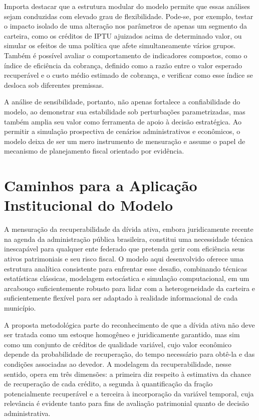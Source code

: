 \documentclass[a4paper,12pt]{article}
\begin{document}
Importa destacar que a estrutura modular do modelo permite que essas análises sejam conduzidas com elevado grau de flexibilidade. Pode-se, por exemplo, testar o impacto isolado de uma alteração nos parâmetros de apenas um segmento da carteira, como os créditos de IPTU ajuizados acima de determinado valor, ou simular os efeitos de uma política que afete simultaneamente vários grupos. Também é possível avaliar o comportamento de indicadores compostos, como o índice de eficiência da cobrança, definido como a razão entre o valor esperado recuperável e o custo médio estimado de cobrança, e verificar como esse índice se desloca sob diferentes premissas.

A análise de sensibilidade, portanto, não apenas fortalece a confiabilidade do modelo, ao demonstrar sua estabilidade sob perturbações parametrizadas, mas também amplia seu valor como ferramenta de apoio à decisão estratégica. Ao permitir a simulação prospectiva de cenários administrativos e econômicos, o modelo deixa de ser um mero instrumento de mensuração e assume o papel de mecanismo de planejamento fiscal orientado por evidência.

\section{Caminhos para a Aplicação Institucional do Modelo}
A mensuração da recuperabilidade da dívida ativa, embora juridicamente recente na agenda da administração pública brasileira, constitui uma necessidade técnica inescapável para qualquer ente federado que pretenda gerir com eficiência seus ativos patrimoniais e seu risco fiscal. O modelo aqui desenvolvido oferece uma estrutura analítica consistente para enfrentar esse desafio, combinando técnicas estatísticas clássicas, modelagem estocástica e simulação computacional, em um arcabouço suficientemente robusto para lidar com a heterogeneidade da carteira e suficientemente flexível para ser adaptado à realidade informacional de cada município.

A proposta metodológica parte do reconhecimento de que a dívida ativa não deve ser tratada como um estoque homogêneo e juridicamente garantido, mas sim como um conjunto de créditos de qualidade variável, cujo valor econômico depende da probabilidade de recuperação, do tempo necessário para obtê-la e das condições associadas ao devedor. A modelagem da recuperabilidade, nesse sentido, opera em três dimensões: a primeira diz respeito à estimativa da chance de recuperação de cada crédito, a segunda à quantificação da fração potencialmente recuperável e a terceira à incorporação da variável temporal, cuja relevância é evidente tanto para fins de avaliação patrimonial quanto de decisão administrativa.
\end{document}
